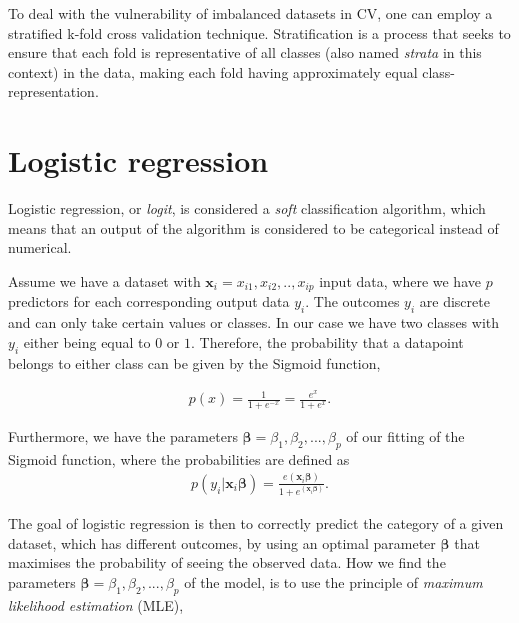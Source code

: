 To deal with the vulnerability of imbalanced datasets in CV, one can employ a stratified k-fold cross validation technique. Stratification is a process that seeks to ensure that each fold is representative of all classes (also named \textit{strata} in this context) in the data, making each fold having approximately equal class-representation.

\section{Logistic regression}

Logistic regression, or \textit{logit}, is considered a \textit{soft} classification algorithm, which means that an output of the algorithm is considered to be categorical instead of numerical.

Assume we have a dataset with $\boldsymbol{x}_i = {x_{i1}, x_{i2}, .., x_{ip}}$ input data, where we have $p$ predictors for each corresponding output data $y_i$. The outcomes $y_i$ are discrete and can only take certain values or classes. In our case we have two classes with $y_i$ either being equal to $0$ or $1$. Therefore, the probability that a datapoint belongs to either class can be given by the Sigmoid function, %

\begin{align*}
p(x) = \frac{1}{1+ e^{-x}} = \frac{e^{x}}{1+ e^{x}}.
\end{align*}

\noindent Furthermore, we have the parameters $\boldsymbol{\beta} = {\beta_1, \beta_2, ..., \beta_p}$ of our fitting of the Sigmoid function, where the probabilities are defined as
\begin{align*}
p(y_i|\boldsymbol{x}_i \boldsymbol{\beta}) = \frac{e{(\boldsymbol{x}_i \boldsymbol{\beta})}}{1 + e^{(\boldsymbol{x}_i \boldsymbol{\beta})}}.
\end{align*}

\noindent The goal of logistic regression is then to correctly predict the category of a given dataset, which has different outcomes, by using an optimal parameter $\boldsymbol{\beta}$ that maximises the probability of seeing the observed data. How we find the parameters $\boldsymbol{\beta} = {\beta_1, \beta_2, ..., \beta_p}$ of the model, is to use the principle of \textit{maximum likelihood estimation} (MLE),



